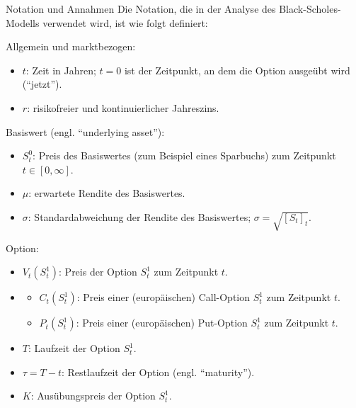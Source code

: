 \begin{bonus}{Notation und Annahmen}
    Die Notation, die in der Analyse des Black-Scholes-Modells verwendet wird, ist wie folgt definiert:

    Allgemein und marktbezogen:
    \begin{itemize}
        \item $t$: Zeit in Jahren; $t = 0$ ist der Zeitpunkt, an dem die Option ausgeübt wird (\enquote{jetzt}).
        \item $r$: risikofreier und kontinuierlicher Jahreszins.
    \end{itemize}

    Basiswert (engl. \enquote{underlying asset}):
    \begin{itemize}
        \item $S_t^0$: Preis des Basiswertes (zum Beispiel eines Sparbuchs) zum Zeitpunkt $t \in [0, \infty]$.
        \item $\mu$: erwartete Rendite des Basiswertes.
        \item $\sigma$: Standardabweichung der Rendite des Basiswertes; $\sigma = \sqrt{[S_t]_t}$.
    \end{itemize}

    Option:
    \begin{itemize}
        \item $V_t(S_t^1)$: Preis der Option $S_t^1$ zum Zeitpunkt $t$.
        \item \begin{itemize}
                  \item $C_t(S_t^1)$: Preis einer (europäischen) Call-Option $S_t^1$ zum Zeitpunkt $t$.
                  \item $P_t(S_t^1)$: Preis einer (europäischen) Put-Option $S_t^1$ zum Zeitpunkt $t$.
              \end{itemize}
        \item $T$: Laufzeit der Option $S_t^1$.
        \item $\tau = T - t$: Restlaufzeit der Option (engl. \enquote{maturity}).
        \item $K$: Ausübungspreis der Option $S_t^1$.
    \end{itemize}


\end{bonus}
